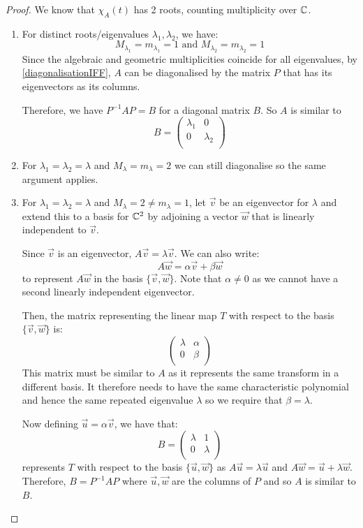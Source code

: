 \documentclass[../main.tex]{subfiles}
\begin{document}
\begin{proof}
  We know that $\chi_A(t)$ has 2 roots, counting multiplicity over $\mathbb{C}$.
  \begin{enumerate}
    \item For distinct roots/eigenvalues $\lambda_1, \lambda_2$, we have:
      \[
        M_{\lambda_1} = m_{\lambda_1} = 1 \text{ and } M_{\lambda_2} = m_{\lambda_2} = 1
      \]
      Since the algebraic and geometric multiplicities coincide for all eigenvalues, by \cref{diagonalisationIFF}, $A$ can be diagonalised by the matrix $P$ that has its eigenvectors as its columns.

      Therefore, we have $P^{-1}AP = B$ for a diagonal matrix $B$.
      So $A$ is similar to
      \[
        B = \begin{pmatrix}
        \lambda_1 & 0 \\
        0 & \lambda_2 \\
        \end{pmatrix}
      \]
    \item For $\lambda_1 = \lambda_2 = \lambda$ and $M_\lambda = m_{\lambda} = 2$ we can still diagonalise so the same argument applies.
    \item For $\lambda_1 = \lambda_2 = \lambda$ and $M_\lambda = 2 \neq m_{\lambda} = 1$, let $\vec{v}$ be an eigenvector for $\lambda$ and extend this to a basis for $\mathbb{C}^{2}$ by adjoining a vector $\vec{w}$ that is linearly independent to $\vec{v}$.

      Since $\vec{v}$ is an eigenvector, $A \vec{v} = \lambda \vec{v}$.
      We can also write:
      \[
        A\vec{w} = \alpha \vec{v} + \beta \vec{w}
      \]
      to represent $A\vec{w}$ in the basis $\{\vec{v}, \vec{w}\}$.
      Note that $\alpha \neq 0$ as we cannot have a second linearly independent eigenvector.

      Then, the matrix representing the linear map $T$ with respect to the basis $\{\vec{v}, \vec{w}\}$ is:
      \[
        \begin{pmatrix}
        \lambda & \alpha \\
        0 & \beta \\
        \end{pmatrix}
      \]
      This matrix must be similar to $A$ as it represents the same transform in a different basis.
      It therefore needs to have the same characteristic polynomial and hence the same repeated eigenvalue $\lambda$ so we require that $\beta = \lambda$.

      Now defining $\vec{u} = \alpha \vec{v}$, we have that:
      \[
        B = \begin{pmatrix}
        \lambda & 1 \\
        0 & \lambda \\
        \end{pmatrix}
      \]
      represents $T$ with respect to the basis $\{\vec{u}, \vec{w}\}$ as $A\vec{u} = \lambda \vec{u}$ and $A\vec{w} = \vec{u} + \lambda \vec{w}$.
      Therefore, $B = P^{-1} A P$ where $\vec{u}, \vec{w}$ are the columns of $P$ and so $A$ is similar to $B$.
  \end{enumerate}
\end{proof}
\end{document}
